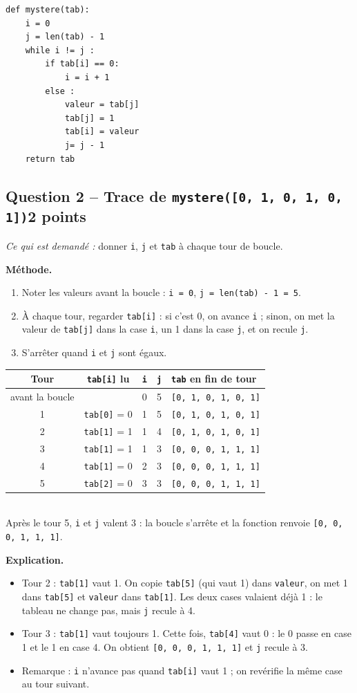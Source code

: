 \documentclass[11pt, a4paper]{exam}
\newcommand{\code}[1]{\texttt{#1}}
\newcommand{\Qt}[2]{\subsection*{#1\hfill{\normalfont\small #2}}}
\newcommand{\rappel}[1]{\noindent\textit{Ce qui est demandé :} #1\par\smallskip}
\newcommand{\methode}{\noindent\textbf{Méthode.}\ }
\newcommand{\explication}{\noindent\textbf{Explication.}\ }
\begin{document}
\begin{lstlisting}
def mystere(tab):
    i = 0
    j = len(tab) - 1
    while i != j :
        if tab[i] == 0:
            i = i + 1
        else :
            valeur = tab[j]
            tab[j] = 1
            tab[i] = valeur
            j= j - 1
    return tab
\end{lstlisting}

\Qt{Question 2 -- Trace de \code{mystere([0, 1, 0, 1, 0, 1])}}{2 points}
\rappel{donner \code{i}, \code{j} et \code{tab} à chaque tour de boucle.}

\methode
\begin{enumerate}
\item Noter les valeurs avant la boucle : \code{i = 0}, \code{j = len(tab) - 1 = 5}.
\item À chaque tour, regarder \code{tab[i]} : si c'est 0, on avance \code{i} ; sinon, on met la valeur de \code{tab[j]} dans la case \code{i}, un 1 dans la case \code{j}, et on recule \code{j}.
\item S'arrêter quand \code{i} et \code{j} sont égaux.
\end{enumerate}

\begin{reponse}
\begin{tabular}{|c|c|c|c|l|}\hline
Tour & \code{tab[i]} lu & \code{i} & \code{j} & \code{tab} en fin de tour \\\hline
avant la boucle & & 0 & 5 & \code{[0, 1, 0, 1, 0, 1]} \\\hline
1 & \code{tab[0]} = 0 & 1 & 5 & \code{[0, 1, 0, 1, 0, 1]} \\
2 & \code{tab[1]} = 1 & 1 & 4 & \code{[0, 1, 0, 1, 0, 1]} \\
3 & \code{tab[1]} = 1 & 1 & 3 & \code{[0, 0, 0, 1, 1, 1]} \\
4 & \code{tab[1]} = 0 & 2 & 3 & \code{[0, 0, 0, 1, 1, 1]} \\
5 & \code{tab[2]} = 0 & 3 & 3 & \code{[0, 0, 0, 1, 1, 1]} \\\hline
\end{tabular}\\
Après le tour 5, \code{i} et \code{j} valent 3 : la boucle s'arrête et la fonction renvoie \code{[0, 0, 0, 1, 1, 1]}.
\end{reponse}

\explication
\begin{itemize}
\item Tour 2 : \code{tab[1]} vaut 1. On copie \code{tab[5]} (qui vaut 1) dans \code{valeur}, on met 1 dans \code{tab[5]} et \code{valeur} dans \code{tab[1]}. Les deux cases valaient déjà 1 : le tableau ne change pas, mais \code{j} recule à 4.
\item Tour 3 : \code{tab[1]} vaut toujours 1. Cette fois, \code{tab[4]} vaut 0 : le 0 passe en case 1 et le 1 en case 4. On obtient \code{[0, 0, 0, 1, 1, 1]} et \code{j} recule à 3.
\item Remarque : \code{i} n'avance pas quand \code{tab[i]} vaut 1 ; on revérifie la même case au tour suivant.
\end{itemize}
\end{document}
